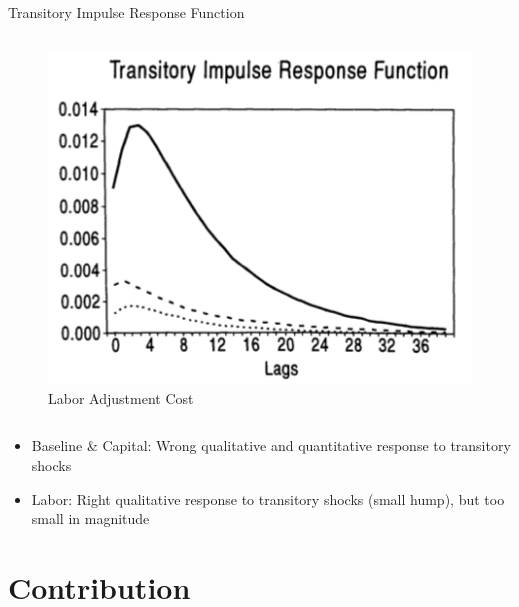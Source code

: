 \documentclass[10pt]{beamer}
\begin{document}
\begin{frame}{Transitory Impulse Response Function}
\begin{columns}[T,onlytextwidth]
		      				\begin{figure}
		      					\centering
		      					\includegraphics[width=\linewidth]{figures/L_trans_IRF.png}
		      					\caption{Labor Adjustment Cost}
		      				\end{figure}
		      			\end{columns}
		      			
		      			\begin{itemize}
		      				\item Baseline \& Capital: Wrong qualitative and quantitative response to transitory
		      				      shocks
		      				\item Labor: Right qualitative response to transitory shocks (small hump), but too small in magnitude
		      			\end{itemize}
		      			
		      		\end{frame}
		      		
		      		\section{Contribution}
		      		
\end{document}
